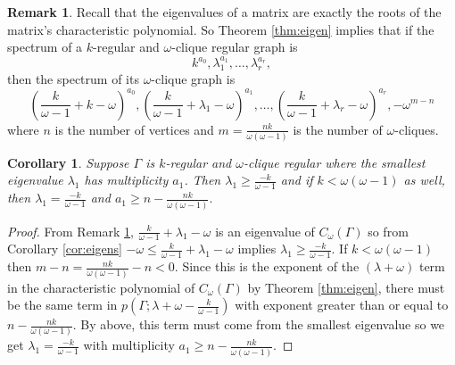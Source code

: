 \documentclass[12pt]{report}
\newtheorem{cor}[thm]{Corollary}
\theoremstyle{definition}
\newtheorem{remark}[thm]{Remark}
\begin{document}
\begin{remark} \label{rem:eigen}
    Recall that the eigenvalues of a matrix are exactly the roots of the matrix's characteristic polynomial. So Theorem \ref{thm:eigen} implies that if the spectrum of a $k$-regular and $\omega$-clique regular graph is
    \[k^{a_0},\lambda_1^{a_1}, \ldots , \lambda_r^{a_r},\]
    then the spectrum of its $\omega$-clique graph is 
    \[\left(\frac{k}{\omega -1} + k -\omega \right)^{a_0}, \left(\frac{k}{\omega -1} + \lambda_1 -\omega \right)^{a_1}, \ldots, \left(\frac{k}{\omega -1} + \lambda_r -\omega \right)^{a_r}, -\omega^{m-n}\]
    where $n$ is the number of vertices and $m=\frac{nk}{\omega(\omega -1)}$ is the number of $\omega$-cliques.
\end{remark}
\clearpage
\begin{cor} \label{cor:lowbound}
    Suppose $\Gamma$ is $k$-regular and $\omega$-clique regular where the smallest eigenvalue $\lambda_1$ has multiplicity $a_1$. Then $\lambda_1 \geq \frac{-k}{\omega-1}$ and if $k < \omega(\omega -1)$ as well, then $\lambda_1 = \frac{-k}{\omega-1}$ and $a_1 \geq n-\frac{nk}{\omega(\omega -1)}.$
\end{cor}
\begin{proof}
    From Remark \ref{rem:eigen}, $\frac{k}{\omega -1}+\lambda_1 -\omega$ is an eigenvalue of $C_\omega(\Gamma)$ so from Corollary \ref{cor:eigens} $-\omega \leq \frac{k}{\omega -1} +\lambda_1 -\omega$ implies $\lambda_1 \geq \frac{-k}{\omega -1}$. If $k < \omega(\omega-1)$ then $m-n=\frac{nk}{\omega(\omega -1)}-n <0$. Since this is the exponent of the $(\lambda + \omega)$ term in the characteristic polynomial of $C_\omega(\Gamma)$ by Theorem \ref{thm:eigen}, there must be the same term in $p(\Gamma; \lambda +\omega - \frac{k}{\omega -1})$ with exponent greater than or equal to $n-\frac{nk}{\omega(\omega -1)}$. By above, this term must come from the smallest eigenvalue so we get $\lambda_1 = \frac{-k}{\omega -1}$ with multiplicity $a_1 \geq n - \frac{nk}{\omega(\omega -1)}$.
\end{proof}
\end{document}
